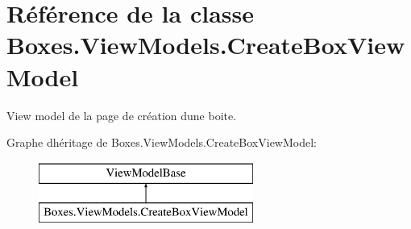 \hypertarget{class_boxes_1_1_view_models_1_1_create_box_view_model}{}\section{Référence de la classe Boxes.\+View\+Models.\+Create\+Box\+View\+Model}
\label{class_boxes_1_1_view_models_1_1_create_box_view_model}


View model de la page de création d\textquotesingle{}une boite.  


Graphe d\textquotesingle{}héritage de Boxes.\+View\+Models.\+Create\+Box\+View\+Model\+:\begin{figure}[H]
\begin{center}
\leavevmode
\includegraphics[height=2.000000cm]{class_boxes_1_1_view_models_1_1_create_box_view_model}
\end{center}
\end{figure}
